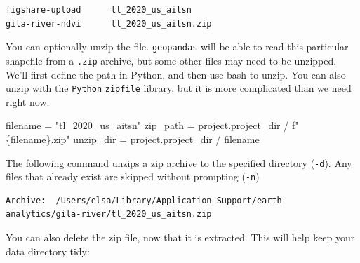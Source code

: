 \documentclass[
  letterpaper,
  DIV=11,
  numbers=noendperiod,
  oneside]{scrreprt}
\newenvironment{Shaded}{\begin{snugshade}}{\end{snugshade}}
\newcommand{\NormalTok}[1]{\textcolor[rgb]{0.00,0.23,0.31}{#1}}
\newcommand{\OperatorTok}[1]{\textcolor[rgb]{0.37,0.37,0.37}{#1}}
\newcommand{\SpecialCharTok}[1]{\textcolor[rgb]{0.37,0.37,0.37}{#1}}
\newcommand{\SpecialStringTok}[1]{\textcolor[rgb]{0.13,0.47,0.30}{#1}}
\newcommand{\StringTok}[1]{\textcolor[rgb]{0.13,0.47,0.30}{#1}}
\begin{document}
\begin{verbatim}
figshare-upload      tl_2020_us_aitsn
gila-river-ndvi      tl_2020_us_aitsn.zip
\end{verbatim}

You can optionally unzip the file. \texttt{geopandas} will be able to
read this particular shapefile from a \texttt{.zip} archive, but some
other files may need to be unzipped. We'll first define the path in
Python, and then use bash to unzip. You can also unzip with the
\texttt{Python} \texttt{zipfile} library, but it is more complicated
than we need right now.

\begin{Shaded}
\begin{Highlighting}[]
\NormalTok{filename }\OperatorTok{=} \StringTok{"tl\_2020\_us\_aitsn"}
\NormalTok{zip\_path }\OperatorTok{=}\NormalTok{ project.project\_dir }\OperatorTok{/} \SpecialStringTok{f"}\SpecialCharTok{\{}\NormalTok{filename}\SpecialCharTok{\}}\SpecialStringTok{.zip"}
\NormalTok{unzip\_dir }\OperatorTok{=}\NormalTok{ project.project\_dir }\OperatorTok{/}\NormalTok{ filename}
\end{Highlighting}
\end{Shaded}

The following command unzips a zip archive to the specified directory
(\texttt{-d}). Any files that already exist are skipped without
prompting (\texttt{-n})

\begin{Shaded}
\end{Shaded}

\begin{verbatim}
Archive:  /Users/elsa/Library/Application Support/earth-analytics/gila-river/tl_2020_us_aitsn.zip
\end{verbatim}

You can also delete the zip file, now that it is extracted. This will
help keep your data directory tidy:

\begin{Shaded}
\end{Shaded}
\end{document}
